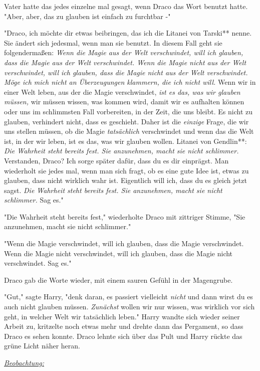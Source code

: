 {Vater hatte das jedes einzelne mal gesagt, wenn Draco das Wort benutzt hatte. "Aber, aber, das zu glauben ist einfach zu furchtbar -"

"Draco, ich möchte dir etwas beibringen, das ich die Litanei von Tarski** nenne. Sie ändert sich jedesmal, wenn man sie benutzt. In diesem Fall geht sie folgendermaßen: \emph{Wenn die Magie aus der Welt verschwindet, will ich glauben, dass die Magie aus der Welt verschwindet. Wenn die Magie nicht aus der Welt verschwindet, will ich glauben, dass die Magie nicht aus der Welt verschwindet. Möge ich mich nicht an Überzeugungen klammern, die ich nicht will.} Wenn wir in einer Welt leben, aus der die Magie verschwindet, \emph{ist es das, was wir glauben müssen,} wir müssen wissen, was kommen wird, damit wir es aufhalten können oder uns im schlimmsten Fall vorbereiten, in der Zeit, die uns bleibt. Es nicht zu glauben, verhindert nicht, dass es geschieht. Daher ist die \emph{einzige} Frage, die wir uns stellen müssen, ob die Magie \emph{tatsächlich} verschwindet und wenn das die Welt ist, in der wir leben, ist es das, was wir glauben wollen. Litanei von Gendlin**: \emph{Die Wahrheit steht bereits fest. Sie anzunehmen, macht sie nicht schlimmer.} Verstanden, Draco? Ich sorge später dafür, dass du es dir einprägst. Man wiederholt sie jedes mal, wenn man sich fragt, ob es eine gute Idee ist, etwas zu glauben, dass nicht wirklich wahr ist. Eigentlich will ich, dass du es gleich jetzt sagst. \emph{Die Wahrheit steht bereits fest. Sie anzunehmen, macht sie nicht schlimmer.} Sag es."

"Die Wahrheit steht bereits fest," wiederholte Draco mit zittriger Stimme, "Sie anzunehmen, macht sie nicht schlimmer."

"Wenn die Magie verschwindet, will ich glauben, dass die Magie verschwindet. Wenn die Magie nicht verschwindet, will ich glauben, dass die Magie nicht verschwindet. Sag es."

Draco gab die Worte wieder, mit einem sauren Gefühl in der Magengrube.

"Gut," sagte Harry, "denk daran, es passiert vielleicht \emph{nicht} und dann wirst du es auch nicht glauben müssen. \emph{Zunächst} wollen wir nur wissen, was wirklich vor sich geht, in welcher Welt wir tatsächlich leben." Harry wandte sich wieder seiner Arbeit zu, kritzelte noch etwas mehr und drehte dann das Pergament, so dass Draco es sehen konnte. Draco lehnte sich über das Pult und Harry rückte das grüne Licht näher heran.

\emph{\uline{Beobachtung:}}

}
